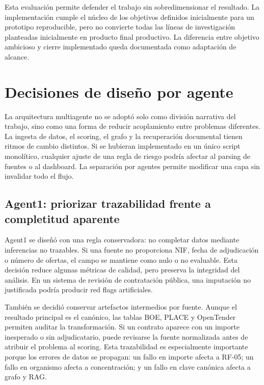 \documentclass[11pt,a4paper,spanish]{book}
\numberwithin{equation}{chapter}
\numberwithin{figure}{chapter}
\begin{document}
Esta evaluaci{\'o}n permite defender el trabajo sin sobredimensionar el resultado. La implementaci{\'o}n
cumple el n{\'u}cleo de los objetivos definidos inicialmente para un prototipo reproducible, pero no convierte todas las l{\'i}neas de
investigaci{\'o}n planteadas inicialmente en producto final productivo. La diferencia entre objetivo
ambicioso y cierre implementado queda documentada como adaptaci{\'o}n de alcance.

\section{Decisiones de dise{\~n}o por agente}
\label{sec:decisiones_diseno_agentes}

La arquitectura multiagente no se adopt{\'o} solo como divisi{\'o}n narrativa del trabajo, sino como una
forma de reducir acoplamiento entre problemas diferentes. La ingesta de datos, el scoring, el grafo
y la recuperaci{\'o}n documental tienen ritmos de cambio distintos. Si se hubieran implementado en un
{\'u}nico script monol{\'i}tico, cualquier ajuste de una regla de riesgo podr{\'i}a afectar al parsing de
fuentes o al dashboard. La separaci{\'o}n por agentes permite modificar una capa sin invalidar todo el
flujo.

\subsection{Agent1: priorizar trazabilidad frente a completitud aparente}

Agent1 se dise{\~n}{\'o} con una regla conservadora: no completar datos mediante inferencias no
trazables. Si una fuente no proporciona NIF, fecha de adjudicaci{\'o}n o n{\'u}mero de ofertas, el
campo se mantiene como nulo o no evaluable. Esta decisi{\'o}n reduce algunas m{\'e}tricas de calidad,
pero preserva la integridad del an{\'a}lisis. En un sistema de revisi{\'o}n de contrataci{\'o}n p{\'u}blica,
una imputaci{\'o}n no justificada podr{\'i}a producir red flags artificiales.

Tambi{\'e}n se decidi{\'o} conservar artefactos intermedios por fuente. Aunque el resultado principal es
el can{\'o}nico, las tablas BOE, PLACE y OpenTender permiten auditar la transformaci{\'o}n. Si un
contrato aparece con un importe inesperado o sin adjudicatario, puede revisarse la fuente
normalizada antes de atribuir el problema al scoring. Esta trazabilidad es especialmente importante
porque los errores de datos se propagan: un fallo en importe afecta a RF-05; un fallo en organismo
afecta a concentraci{\'o}n; y un fallo en clave can{\'o}nica afecta a grafo y RAG.
\end{document}
